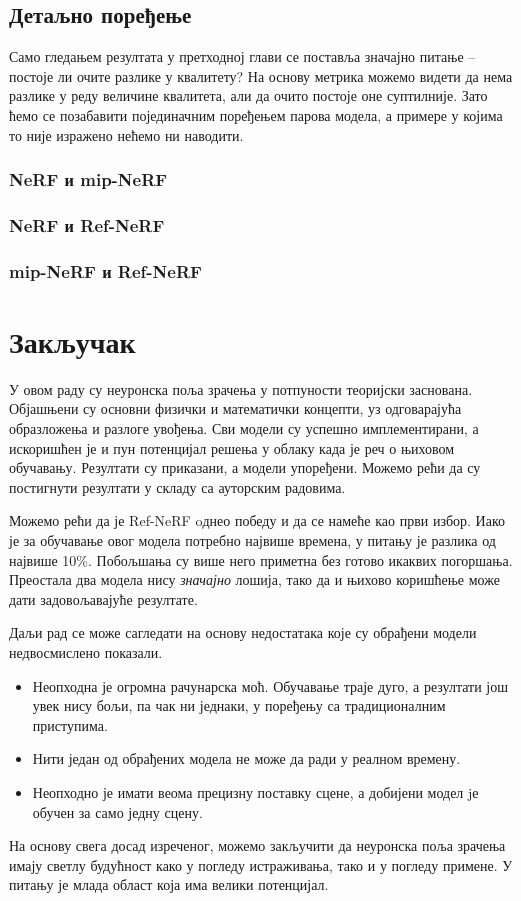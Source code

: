 \documentclass[12pt, a4paper, twoside]{book}
\numberwithin{equation}{chapter}
\numberwithin{theorem}{section}
\numberwithin{definition}{section}
\numberwithin{definitionChapter}{chapter}
\begin{document}
\section{Детаљно поређење}
Само гледањем резултата у претходној глави се поставља значајно питање -- постоје ли очите разлике у квалитету?
На основу метрика можемо видети да нема разлике у реду величине квалитета, али да очито постоје оне суптилније.
Зато ћемо се позабавити појединачним поређењем парова модела, а примере у којима то није изражено нећемо ни наводити.

\subsection{NeRF и mip-NeRF}
\subsection{NeRF и Ref-NeRF}
\subsection{mip-NeRF и Ref-NeRF}

\chapter{Закључак}
У овом раду су неуронска поља зрачења у потпуности теоријски заснована. Објашњени су основни физички и математички
концепти, уз одговарајућа образложења и разлоге увођења. Сви модели су успешно имплементирани, а искоришћен је и
пун потенцијал решења у облаку када је реч о њиховом обучавању. Резултати су приказани, а модели упоређени.
Можемо рећи да су постигнути резултати у складу са ауторским радовима.

Можемо рећи да је Ref-NeRF oднео победу и да се намеће као први избор. Иако је за обучавање овог модела потребно 
највише времена, у питању је разлика од највише 10\%. Побољшања су више него приметна без готово икаквих погоршања.
Преостала два модела нису \textit{значајно} лошија, тако да и њихово коришћење може дати задовољавајуће резултате.

Даљи рад се може сагледати на основу недостатака које су обрађени модели недвосмислено показали.
\begin{itemize}
	\item Неопходна је огромна рачунарска моћ. Обучавање траје дуго, а резултати још увек нису
	бољи, па чак ни једнаки, у поређењу са традиционалним приступима.
	\item Нити један од обрађених модела не може да ради у реалном времену.
	\item Неопходно је имати веома прецизну поставку сцене, а добијени модел jе обучен за само једну сцену.
\end{itemize}

На основу свега досад изреченог, можемо закључити да неуронска поља зрачења имају светлу будућност како у погледу
истраживања, тако и у погледу примене. У питању је млада област која има велики потенцијал.



\end{document}
